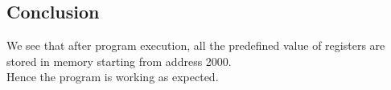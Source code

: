 \documentclass[a4paper]{article} %
\begin{document}
    \subsection{Conclusion}
        We see that after program execution, all the predefined value of registers are stored in memory starting from address 2000.\\
        Hence the program is working as expected.
\newpage
\end{document}
